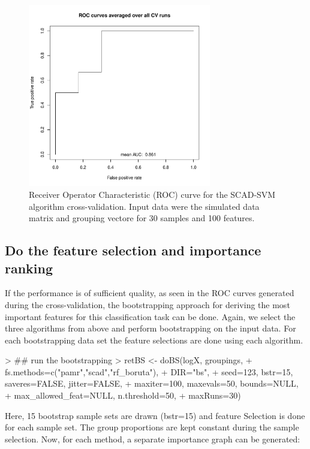 \documentclass[11pt,a4paper]{article}
\begin{document}
\begin{figure}[htp]
\centering
\includegraphics[width=8cm,height=8cm]{rocscad}
\caption{Receiver Operator Characteristic (ROC) curve for the SCAD-SVM algorithm cross-validation. Input data were the simulated data matrix and grouping vectore for 30 samples and 100 features.}
\label{fig:rocscad}
\end{figure}



\subsection{Do the feature selection and importance ranking}

If the performance is of sufficient quality, as seen in the ROC curves generated during the cross-validation, the bootstrapping approach for deriving the most important features for this classification task can be done. Again, we select the three algorithms from above and perform bootstrapping on the input data. For each bootstrapping data set the feature selections are done using each algorithm. 

\begin{Schunk}
\begin{Sinput}
> ## run the bootstrapping
> retBS <- doBS(logX, groupings, 
+ 	fs.methods=c("pamr","scad","rf_boruta"),
+ 	DIR="bs", 
+ 	seed=123, bstr=15, saveres=FALSE, jitter=FALSE,
+ 	maxiter=100, maxevals=50, bounds=NULL,
+ 	max_allowed_feat=NULL, n.threshold=50,
+ 	maxRuns=30)
\end{Sinput}
\end{Schunk}

Here, 15 bootstrap sample sets are drawn (bstr=15) and feature Selection is done for each sample set. The group proportions are kept constant during the sample selection. Now, for each method, a separate importance graph can be generated:
\end{document}
